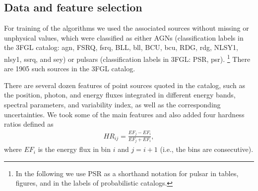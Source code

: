 \documentclass[referee]{aa} %
\newcommand{\bea}{\begin{eqnarray}}
\newcommand{\eea}{\end{eqnarray}}
\newcommand{\lb}{\label}
\begin{document}
\subsection{Data and feature selection}

For training of the algorithms we used the associated sources without missing or unphysical values, 
which were classified as either AGNs (classification labels in the 3FGL catalog: agn, FSRQ, fsrq, BLL, bll, BCU, bcu, RDG, rdg, NLSY1, nlsy1, ssrq, and sey) or pulsars (classification labels in 3FGL: PSR, psr).%
\footnote{In the following we use PSR as a shorthand notation for pulsar in tables, figures, and in the labels of probabilistic catalogs.}
There are 1905 such sources in the 3FGL catalog. 

There are several dozen features of point sources quoted in the catalog, such as the position, photon, and energy fluxes integrated in different energy bands, spectral parameters, and variability index, as well as the corresponding uncertainties. 
We took some of the main features and also added four hardness ratios defined as 
\bea
\lb{eq:hr}
HR_{ij} = \frac{EF_j - EF_i}{EF_j + EF_i},
\eea
where $EF_i$ is the energy flux in bin $i$ and $j = i + 1$ (i.e., the bins are consecutive).
\end{document}
